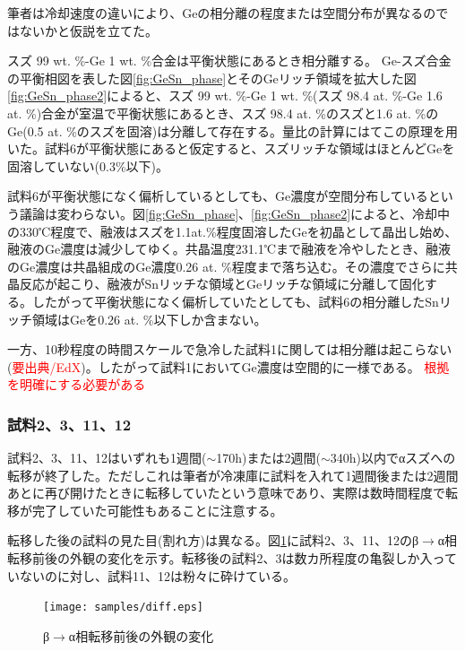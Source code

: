 筆者は冷却速度の違いにより、Geの相分離の程度または空間分布が異なるのではないかと仮説を立てた。

スズ 99 wt. \%-Ge 1 wt. \%合金は平衡状態にあるとき相分離する。
Ge-スズ合金の平衡相図を表した図\ref{fig:GeSn_phase}とそのGeリッチ領域を拡大した図\ref{fig:GeSn_phase2}によると、スズ 99 wt. \%-Ge 1 wt. \%(スズ 98.4 at. \%-Ge 1.6 at. \%)合金が室温で平衡状態にあるとき、スズ 98.4 at. \%のスズと1.6 at. \%のGe(0.5 at. \%のスズを固溶)は分離して存在する。量比の計算にはてこの原理を用いた。試料6が平衡状態にあると仮定すると、スズリッチな領域はほとんどGeを固溶していない(0.3\%以下\cite{Thurmond1960})。

試料6が平衡状態になく偏析しているとしても、Ge濃度が空間分布しているという議論は変わらない。図\ref{fig:GeSn_phase}、\ref{fig:GeSn_phase2}によると、冷却中の330℃程度で、融液はスズを1.1at.\%程度固溶したGeを初晶として晶出し始め、融液のGe濃度は減少してゆく。共晶温度231.1℃まで融液を冷やしたとき、融液のGe濃度は共晶組成のGe濃度0.26 at. \%程度\cite{Thurmond1960}まで落ち込む。その濃度でさらに共晶反応が起こり、融液がSnリッチな領域とGeリッチな領域に分離して固化する。したがって平衡状態になく偏析していたとしても、試料6の相分離したSnリッチ領域はGeを0.26 at. \%以下しか含まない。

一方、10秒程度の時間スケールで急冷した試料1に関しては相分離は起こらない(\textcolor{red}{要出典/EdX})。したがって試料1においてGe濃度は空間的に一様である。
\textcolor{red}{根拠を明確にする必要がある}

\subsubsection{試料2、3、11、12}
試料2、3、11、12はいずれも1週間($\sim$170h)または2週間($\sim$340h)以内でαスズへの転移が終了した。ただしこれは筆者が冷凍庫に試料を入れて1週間後または2週間あとに再び開けたときに転移していたという意味であり、実際は数時間程度で転移が完了していた可能性もあることに注意する。

転移した後の試料の見た目(割れ方)は異なる。図\ref{fig:diff}に試料2、3、11、12のβ$\to$α相転移前後の外観の変化を示す。転移後の試料2、3は数カ所程度の亀裂しか入っていないのに対し、試料11、12は粉々に砕けている。
\begin{figure}[!h]
    \begin{center}
   \texttt{[image: samples/diff.eps]}
  \end{center}
  \caption{β$\to$α相転移前後の外観の変化}
  \label{fig:diff}
\end{figure}

